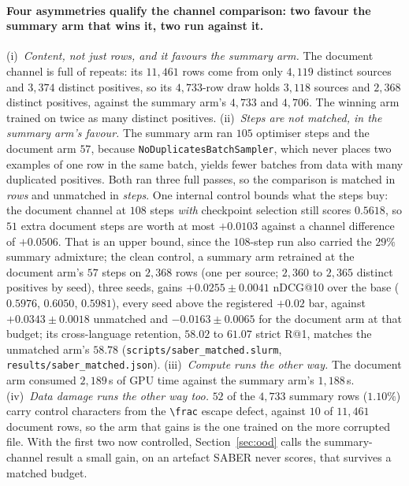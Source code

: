 \paragraph{Four asymmetries qualify the channel comparison: two favour the summary arm that wins it, two run against it.}
(i)~\emph{Content, not just rows, and it favours the summary arm.} The document channel is full of repeats: its $11{,}461$ rows come from only $4{,}119$ distinct sources and $3{,}374$ distinct positives, so its $4{,}733$-row draw holds $3{,}118$ sources and $2{,}368$ distinct positives, against the summary arm's $4{,}733$ and $4{,}706$. The winning arm trained on twice as many distinct positives. (ii)~\emph{Steps are not matched, in the summary arm's favour.} The summary arm ran $105$ optimiser steps and the document arm $57$, because \texttt{NoDuplicatesBatchSampler}, which never places two examples of one row in the same batch, yields fewer batches from data with many duplicated positives. Both ran three full passes, so the comparison is matched in \emph{rows} and unmatched in \emph{steps}. One internal control bounds what the steps buy: the document channel at $108$ steps \emph{with} checkpoint selection still scores $0.5618$, so $51$ extra document steps are worth at most $+0.0103$ against a channel difference of $+0.0506$. That is an upper bound, since the $108$-step run also carried the $29\%$ summary admixture; the clean control, a summary arm retrained at the document arm's $57$ steps on $2{,}368$ rows (one per source; $2{,}360$ to $2{,}365$ distinct positives by seed), three seeds, gains $+0.0255 \pm 0.0041$ nDCG@10 over the base ($0.5976$, $0.6050$, $0.5981$), every seed above the registered $+0.02$ bar, against $+0.0343 \pm 0.0018$ unmatched and $-0.0163 \pm 0.0065$ for the document arm at that budget; its cross-language retention, $58.02$ to $61.07$ strict R@1, matches the unmatched arm's $58.78$ (\texttt{scripts/saber\_matched.slurm}, \texttt{results/saber\_matched.json}). (iii)~\emph{Compute runs the other way.} The document arm consumed $2{,}189$\,s of GPU time against the summary arm's $1{,}188$\,s. (iv)~\emph{Data damage runs the other way too.} $52$ of the $4{,}733$ summary rows ($1.10\%$) carry control characters from the \verb|\frac| escape defect, against $10$ of $11{,}461$ document rows, so the arm that gains is the one trained on the more corrupted file. With the first two now controlled, Section~\ref{sec:ood} calls the summary-channel result a small gain, on an artefact SABER never scores, that survives a matched budget.


